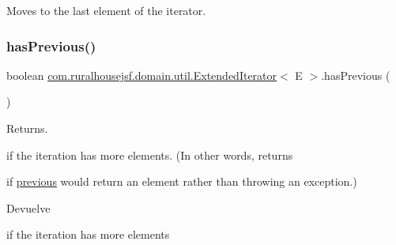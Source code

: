 Moves to the last element of the iterator. 

\mbox{\label{interfacecom_1_1ruralhousejsf_1_1domain_1_1util_1_1_extended_iterator_a8aa41cc3f69db973663cf92a484579a9}} 
\subsubsection{\texorpdfstring{hasPrevious()}{hasPrevious()}}
{\footnotesize\ttfamily boolean \mbox{\hyperlink{interfacecom_1_1ruralhousejsf_1_1domain_1_1util_1_1_extended_iterator}{com.\+ruralhousejsf.\+domain.\+util.\+Extended\+Iterator}}$<$ E $>$.has\+Previous (\begin{DoxyParamCaption}{ }\end{DoxyParamCaption})}



Returns. 


\begin{DoxyCode}{0}
\DoxyCodeLine{\textcolor{keyword}{true} }
\end{DoxyCode}
 if the iteration has more elements. (In other words, returns
\begin{DoxyCode}{0}
\DoxyCodeLine{\textcolor{keyword}{true} }
\end{DoxyCode}
 if \mbox{\hyperlink{interfacecom_1_1ruralhousejsf_1_1domain_1_1util_1_1_extended_iterator_a4c9f9f5da6e96c08bc44d55517689397}{previous}} would return an element rather than throwing an exception.)

\begin{DoxyReturn}{Devuelve}

\begin{DoxyCode}{0}
\DoxyCodeLine{\textcolor{keyword}{true} }
\end{DoxyCode}
 if the iteration has more elements 
\end{DoxyReturn}
\mbox{\label{interfacecom_1_1ruralhousejsf_1_1domain_1_1util_1_1_extended_iterator_a4c9f9f5da6e96c08bc44d55517689397}} 
